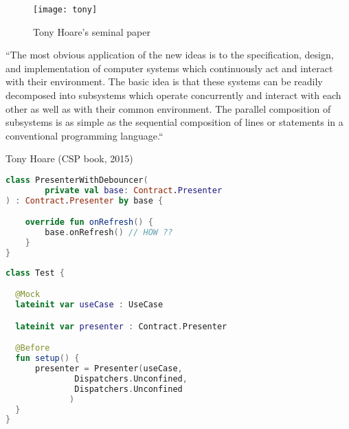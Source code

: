 \documentclass[10pt]{beamer}
\begin{document}
\begin{frame}[fragile]
	\begin{figure}
		\texttt{[image: tony]}
		\caption{Tony Hoare's seminal paper}
	\end{figure}
\end{frame}
\begin{frame}[fragile]
``The most obvious application of the new ideas is to the specification, design,
and implementation of computer systems which continuously act and
interact with their environment. The basic idea is that these systems can be
readily decomposed into subsystems which operate concurrently and interact
with each other as well as with their common environment. The parallel composition
of subsystems is as simple as the sequential composition of lines or
statements in a conventional programming language.``

	Tony Hoare (CSP book, 2015)
\end{frame}





\begin{frame}[fragile]
\begin{lstlisting}[language=Kotlin, basicstyle=\ttfamily]
class PresenterWithDebouncer(
        private val base: Contract.Presenter
) : Contract.Presenter by base {

    override fun onRefresh() {
        base.onRefresh() // HOW ??
    }
}
\end{lstlisting}
\end{frame}


\begin{frame}[fragile]
\begin{lstlisting}[language=Kotlin, basicstyle=\ttfamily]
class Test {

  @Mock
  lateinit var useCase : UseCase

  lateinit var presenter : Contract.Presenter

  @Before
  fun setup() {
      presenter = Presenter(useCase,
              Dispatchers.Unconfined,
              Dispatchers.Unconfined
             )
  }
}
\end{lstlisting}
\end{frame}
\end{document}
